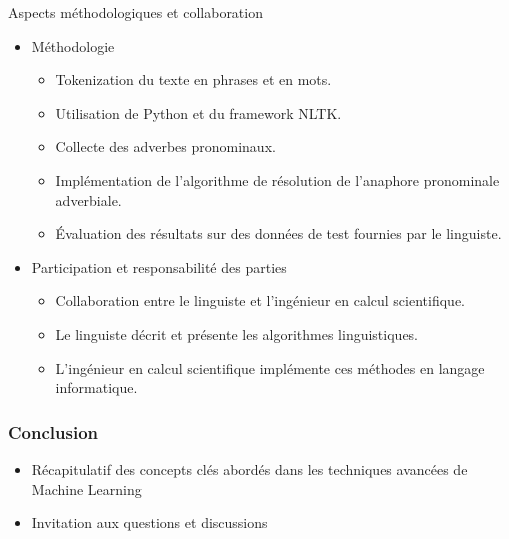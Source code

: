 \documentclass{beamer}
\begin{document}
\begin{frame}{Aspects méthodologiques et collaboration}
	\begin{itemize}
\item Méthodologie
	\begin{itemize}
		\item Tokenization du texte en phrases et en mots.
		\item Utilisation de Python et du framework NLTK.
		\item Collecte des adverbes pronominaux.
		\item Implémentation de l'algorithme de résolution de l'anaphore pronominale adverbiale.
		\item Évaluation des résultats sur des données de test fournies par le linguiste.
	\end{itemize}
\item Participation et responsabilité des parties
  \begin{itemize}
	\item Collaboration entre le linguiste et l'ingénieur en calcul scientifique.
	\item Le linguiste décrit et présente les algorithmes linguistiques.
	\item L'ingénieur en calcul scientifique implémente ces méthodes en langage informatique.
\end{itemize}
\end{itemize}
\end{frame}





\begin{frame}
	\frametitle{Conclusion}
	\begin{itemize}
		\item Récapitulatif des concepts clés abordés dans les techniques avancées de Machine Learning
		\item Invitation aux questions et discussions
	\end{itemize}
\end{frame}
\end{document}
